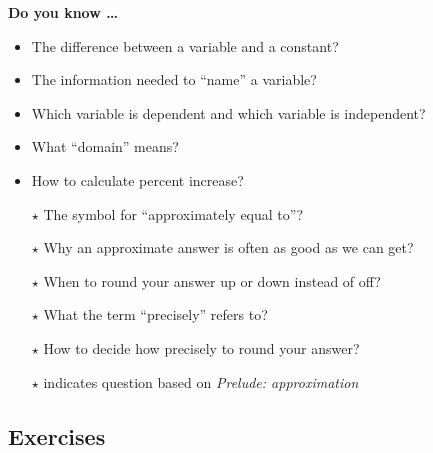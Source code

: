 


\noindent \textbf{Do you know \ldots}

\begin{itemize}
\item The difference between a variable and a constant?
\item The information needed to ``name'' a variable?
\item Which variable is dependent and which variable is independent? 
\item What ``domain'' means?
\item How to calculate percent increase? 
\item[$\star$] The symbol for ``approximately equal to''? 
\item[$\star$] Why an approximate answer is often as good as we can get? 
\item[$\star$] When to round your answer up or down instead of off? 
\item[$\star$] What the term ``precisely'' refers to? 
\item[$\star$] How to decide how precisely to round your answer?

\hfill  $\star$ indicates question based on \emph{Prelude:  approximation}

\end{itemize}

\subsection*{Exercises}

